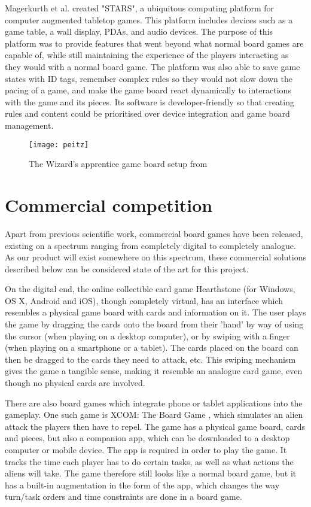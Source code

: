 Magerkurth et al. \citep{magStars} created "STARS", a ubiquitous computing platform for computer augmented tabletop games. This platform includes devices such as a game table, a wall display, PDAs, and audio devices. The purpose of this platform was to provide features that went beyond what normal board games are capable of, while still maintaining the experience of the players interacting as they would with a normal board game. The platform was also able to save game states with ID tags, remember complex rules so they would not slow down the pacing of a game, and make the game board react dynamically to interactions with the game and its pieces. Its software is developer-friendly so that creating rules and content could be prioritised over device integration and game board management. 

\begin{figure}[!h]
\centering	
\texttt{[image: peitz]}
\caption{The Wizard's apprentice game board setup from \citep{peitzWizards2006}}
\label{fig:peitz}
\end{figure}

\section{Commercial competition}
Apart from previous scientific work, commercial board games have been released, existing on a spectrum ranging from completely digital to completely analogue. As our product will exist somewhere on this spectrum, these commercial solutions described below can be considered state of the art for this project.

On the digital end, the online collectible card game Hearthstone \citep{Hearthstone} (for Windows, OS X, Android and iOS), though completely virtual, has an interface which resembles a physical game board with cards and information on it. The user plays the game by dragging the cards onto the board from their 'hand' by way of using the cursor (when playing on a desktop computer), or by swiping with a finger (when playing on a smartphone or a tablet). The cards placed on the board can then be dragged to the cards they need to attack, etc. This swiping mechanism gives the game a tangible sense, making it resemble an analogue card game, even though no physical cards are involved.

There are also board games which integrate phone or tablet applications into the gameplay. One such game is XCOM: The Board Game \citep{XCOM}, which simulates an alien attack the players then have to repel. The game has a physical game board, cards and pieces, but also a companion app, which can be downloaded to a desktop computer or mobile device. The app is required in order to play the game. It tracks the time each player has to do certain tasks, as well as what actions the aliens will take. The game therefore still looks like a normal board game, but it has a built-in augmentation in the form of the app, which changes the way turn/task orders and time constraints are done in a board game.

